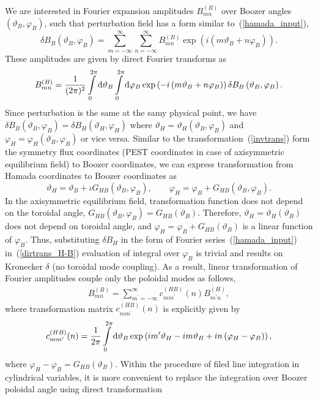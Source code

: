 \documentclass[12pt]{article}
\newcommand{\be}[1]{\begin{equation} \label{#1}}
\newcommand{\ee}{\end{equation}}
\newcommand{\bea}[1]{\begin{eqnarray} \label{#1}}
\newcommand{\eea}{\end{eqnarray}}
\newcommand{\eq}[1]{(\ref{#1})}
\newcommand{\rd}{{\rm d}}
\begin{document}
We are interested in Fourier expansion amplitudes $B_{mn}^{(B)}$ over Boozer angles $\left(\vartheta_B,\varphi_B\right)$, 
such that perturbation field has a form similar to~\eq{hamada_input},
\be{boozer_output}
\delta B_B\left(\vartheta_B,\varphi_B\right) = \sum \limits_{m=-\infty}^\infty\sum \limits_{n=-\infty}^\infty
B_{mn}^{(B)}\exp\left(i\left(m\vartheta_B+n \varphi_B\right)\right).
\ee
These amplitudes are given by direct Fourier transforms as
\be{dirtrans_H-B}
B_{mn}^{(B)} = \frac{1}{(2\pi)^2}\int\limits_{0}^{2\pi}\rd \vartheta_B \int\limits_{0}^{2\pi}\rd \varphi_B
\exp\left(-i\left(m\vartheta_B+n \varphi_B\right)\right) \delta B_B\left(\vartheta_B,\varphi_B\right).
\ee
Since perturbation is the same at the samy physical point, we have 
$\delta B_B\left(\vartheta_B,\varphi_B\right)=\delta B_H\left(\vartheta_H,\varphi_H\right)$
where $\vartheta_H=\vartheta_H\left(\vartheta_B,\varphi_B\right)$ and $\varphi_H=\varphi_H\left(\vartheta_B,\varphi_B\right)$
or vice versa. Similar to the transformation~\eq{invtrans} form the symmetry flux coordinates 
(PEST coordinates in case of axisymmetric equilibrium field) to Boozer coordinates, we can express transformation from
Hamada coordinates to Boozer coordinates as
\be{angtrans_H-B}
\vartheta_H = \vartheta_B + \iota G_{HB}\left(\vartheta_B,\varphi_B\right),
\qquad
\varphi_H = \varphi_B + G_{HB}\left(\vartheta_B,\varphi_B\right).
\ee
In the axisymmetric equilibrium field, transformation function does not depend on the toroidal angle, 
$G_{HB}\left(\vartheta_B,\varphi_B\right)=G_{HB}\left(\vartheta_B\right)$. Therefore, 
$\vartheta_H=\vartheta_H\left(\vartheta_B\right)$ does not depend on toroidal angle, 
and $\varphi_H = \varphi_B + G_{HB}\left(\vartheta_B\right)$ is a linear function of $\varphi_B$.
Thus, substituting $\delta B_H$ in the form of Fourier series~\eq{hamada_input} in~\eq{dirtrans_H-B} 
evaluation of integral over $\varphi_B$ is trivial and results on Kronecker $\delta$ (no toroidal mode coupling).
As a result, linear transformation of Fourier amplitudes couple only the poloidal modes as follows,
\bea{lintrans_H-B}
B_{mn}^{(B)} = \sum \limits_{m^\prime=-\infty}^\infty c_{mm^\prime}^{(HB)}(n) B_{m^\prime n}^{(H)},
\eea
where transformation matrix $c_{mm^\prime}^{(HB)}(n)$ is explicitly given by
\bea{chbn}
c_{mm^\prime}^{(HB)}(n)
=
\frac{1}{2\pi}\int\limits_{0}^{2\pi}\rd \vartheta_B 
\exp\left(im^\prime\vartheta_H-im\vartheta_B+in \left(\varphi_H-\varphi_B\right)\right), 
\eea
where $\varphi_H-\varphi_B=G_{HB}(\vartheta_B)$. Within the procedure of filed line integration in cylindrical
variables, it is more convenient to replace the integration over Boozer poloidal angle using direct transformation
\end{document}
